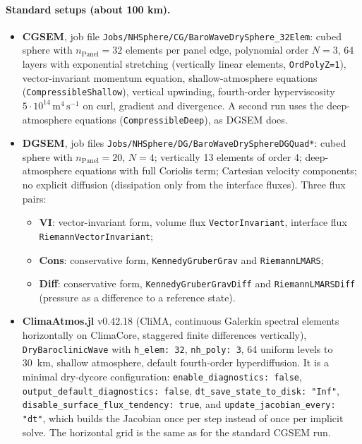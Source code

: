 \documentclass[11pt,a4paper]{article}
\newcommand{\code}[1]{\texttt{#1}}
\begin{document}
\paragraph{Standard setups (about 100 km).}
\begin{itemize}
\item \textbf{CGSEM}, job file \code{Jobs/NHSphere/CG/BaroWaveDrySphere\_32Elem}:
  cubed sphere with $n_\text{Panel}=32$ elements per panel edge,
  polynomial order $N=3$, 64 layers with exponential stretching
  (vertically linear elements, \code{OrdPolyZ=1}),
  vector-invariant momentum equation, shallow-atmosphere equations
  (\code{CompressibleShallow}), vertical upwinding,
  fourth-order hyperviscosity $5\cdot10^{14}\,\mathrm{m^4\,s^{-1}}$
  on curl, gradient and divergence.
  A second run uses the deep-atmosphere equations
  (\code{CompressibleDeep}), as DGSEM does.
\item \textbf{DGSEM}, job files \code{Jobs/NHSphere/DG/BaroWaveDrySphereDGQuad*}:
  cubed sphere with $n_\text{Panel}=20$, $N=4$; vertically 13 elements of
  order 4; deep-atmosphere equations with full Coriolis term; Cartesian
  velocity components; no explicit diffusion (dissipation only from the
  interface fluxes). Three flux pairs:
  \begin{itemize}
  \item \textbf{VI}: vector-invariant form, volume flux
    \code{VectorInvariant}, interface flux \code{RiemannVectorInvariant};
  \item \textbf{Cons}: conservative form, \code{KennedyGruberGrav} and
    \code{RiemannLMARS};
  \item \textbf{Diff}: conservative form, \code{KennedyGruberGravDiff} and
    \code{RiemannLMARSDiff} (pressure as a difference to a reference state).
  \end{itemize}
\item \textbf{ClimaAtmos.jl} v0.42.18 (CliMA, continuous Galerkin
  spectral elements horizontally on ClimaCore, staggered finite
  differences vertically), \code{DryBaroclinicWave} with
  \code{h\_elem: 32}, \code{nh\_poly: 3}, 64 uniform levels to 30~km,
  shallow atmosphere, default fourth-order hyperdiffusion. It is a minimal
  dry-dycore configuration: \code{enable\_diagnostics: false},
  \code{output\_default\_diagnostics: false},
  \code{dt\_save\_state\_to\_disk: "Inf"},
  \code{disable\_surface\_flux\_tendency: true}, and
  \code{update\_jacobian\_every: "dt"}, which builds the Jacobian once per step
  instead of once per implicit solve.
  The horizontal grid is the same as for the standard CGSEM run.

\end{itemize}
\end{document}
